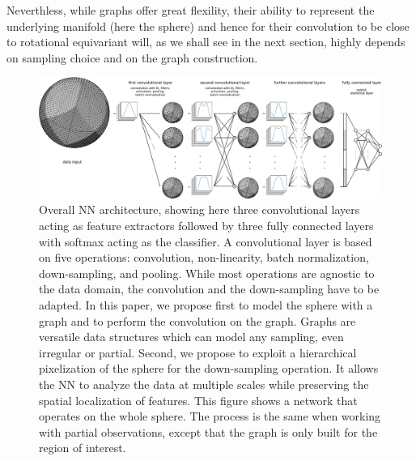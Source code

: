 \documentclass{article} %
\newcommand{\1}{\b{1}}              %
\newcommand{\0}{\b{0}}              %
\newcommand{\todo}[1]{{\color[rgb]{.6,.1,.6}{#1}}}
\begin{document}
Neverthless, while graphs offer great flexility, their ability to represent the underlying manifold (here the sphere) and hence for their convolution to be close to rotational equivariant will, as we shall see in the next section,  highly depends on sampling choice and on the graph construction.



\begin{figure}
	\centering
	\includegraphics[width=\linewidth]{figure_architecture_v3}
	\caption{Overall NN architecture, showing here three convolutional layers acting as feature extractors followed by three fully connected layers with softmax acting as the classifier.
    A convolutional layer is based on five operations: convolution, non-linearity, batch normalization, down-sampling, and pooling.
	While most operations are agnostic to the data domain, the convolution and the down-sampling have to be adapted.
	In this paper, we propose first to model the sphere with a graph and to perform the convolution on the graph.
	Graphs are versatile data structures which can model any sampling, even irregular or partial.
	Second, we propose to exploit a hierarchical pixelization of the sphere for the down-sampling operation.
	It allows the NN to analyze the data at multiple scales while preserving the spatial localization of features.
	This figure shows a network that operates on the whole sphere.
	The process is the same when working with partial observations, except that the graph is only built for the region of interest.}
	\label{fig:architecture}
\end{figure}
\end{document}
